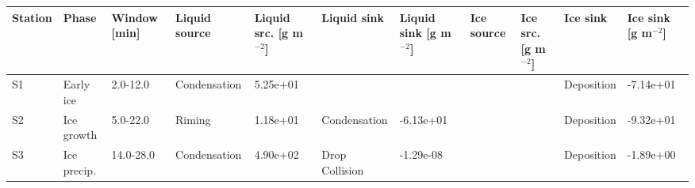 \begin{tabular}{lllllllllll}
\toprule
Station & Phase & Window [min] & Liquid source & Liquid src. [g m$^{-2}$] & Liquid sink & Liquid sink [g m$^{-2}$] & Ice source & Ice src. [g m$^{-2}$] & Ice sink & Ice sink [g m$^{-2}$] \\
\midrule
S1 & Early ice & 2.0-12.0 & Condensation & 5.25e+01 &  &  &  &  & Deposition & -7.14e+01 \\
S2 & Ice growth & 5.0-22.0 & Riming & 1.18e+01 & Condensation & -6.13e+01 &  &  & Deposition & -9.32e+01 \\
S3 & Ice precip. & 14.0-28.0 & Condensation & 4.90e+02 & Drop Collision & -1.29e-08 &  &  & Deposition & -1.89e+00 \\
\bottomrule
\end{tabular}

